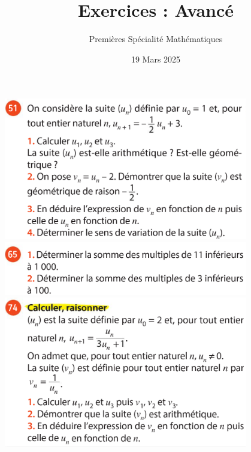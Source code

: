 \documentclass{article}
\title{Exercices : Avancé}
\date{19 Mars 2025}
\author{Premières Spécialité Mathématiques}
\begin{document}
\maketitle

\begin{center}
\includegraphics[width=0.8\textwidth]{Exercice_1.png}
\includegraphics[width=0.8\textwidth]{Exercice_2.png}
\includegraphics[width=0.8\textwidth]{Exercice_3.png}
\end{center}
\end{document}
